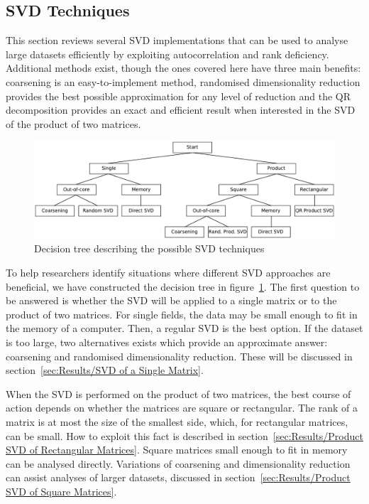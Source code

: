 \documentclass[ijgi,article,submit,moreauthors,pdftex,10pt,a4paper]{Definitions/mdpi}
\begin{document}
\subsection{SVD Techniques}
\label{sec: SVD Techniques}
This section reviews several SVD implementations that can be used to analyse large datasets efficiently by exploiting autocorrelation and rank deficiency. Additional methods exist, though the ones covered here have three main benefits: coarsening is an easy-to-implement method, randomised dimensionality reduction provides the best possible approximation for any level of reduction and the QR decomposition provides an exact and efficient result when interested in the SVD of the product of two matrices.

\begin{figure}[H]
\centering
\includegraphics[width=\textwidth]{Results/FlowDiagram.pdf}
\caption{Decision tree describing the possible SVD techniques}
\label{fig:FlowDiagram}
\end{figure}

To help researchers identify situations where different SVD approaches are beneficial, we have constructed the decision tree in figure~\ref{fig:FlowDiagram}. The first question to be answered is whether the SVD will be applied to a single matrix or to the product of two matrices. For single fields, the data may be small enough to fit in the memory of a computer. Then, a regular SVD is the best option. If the dataset is too large, two alternatives exists which provide an approximate answer: coarsening and randomised dimensionality reduction. These will be discussed in section~\ref{sec:Results/SVD of a Single Matrix}.

When the SVD is performed on the product of two matrices, the best course of action depends on whether the matrices are square or rectangular. The rank of a matrix is at most the size of the smallest side, which, for rectangular matrices, can be small. How to exploit this fact is described in section~\ref{sec:Results/Product SVD of Rectangular Matrices}. Square matrices small enough to fit in memory can be analysed directly. Variations of coarsening and dimensionality reduction can assist analyses of larger datasets, discussed in section~\ref{sec:Results/Product SVD of Square Matrices}.
\end{document}
